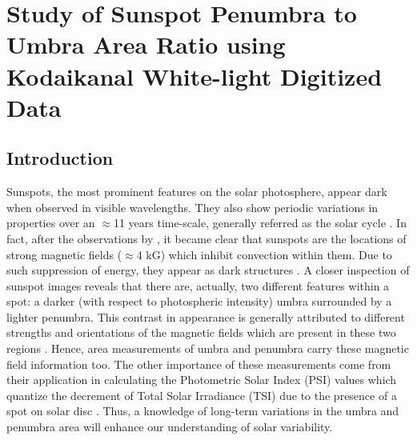 \chapter[Penumbra to Umbra Area Ratio from KoSO Data]{Study of Sunspot Penumbra to Umbra Area Ratio using Kodaikanal White\hyp light Digitized Data}
\label{Chap3}



\noindent

\section{Introduction}
\label{ch3-intro}
Sunspots, the most prominent features on the solar photosphere, appear dark when observed in visible wavelengths. They also show periodic variations in properties over an $\approx$11 years time-scale, generally referred as the solar cycle \citep{Hathaway2015}. In fact, after the observations by \cite{Hale1908}, it became clear that sunspots are the locations of strong magnetic fields ($\approx$4 kG) which inhibit convection within them. Due to such suppression of energy, they appear as dark structures \citep{Solanki2003}. A closer inspection of sunspot images reveals that there are, actually, two different features within a spot: a darker (with respect to photospheric intensity) umbra surrounded by a lighter penumbra. This contrast in appearance is generally attributed to different strengths and orientations of the magnetic fields which are present in these two regions \citep{Mathew2003a}. Hence, area measurements of umbra and penumbra carry these magnetic field information too. The other importance of these measurements come from their application in calculating the Photometric Solar Index (PSI) values which quantize the decrement of Total Solar Irradiance (TSI) due to the presence of a spot on solar disc \citep{Froehlich1977,Hudson1982a}. Thus, a knowledge of long-term variations in the umbra and penumbra area will enhance our understanding of solar variability.



